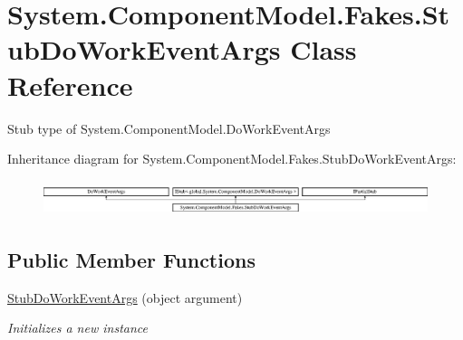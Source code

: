 \hypertarget{class_system_1_1_component_model_1_1_fakes_1_1_stub_do_work_event_args}{\section{System.\-Component\-Model.\-Fakes.\-Stub\-Do\-Work\-Event\-Args Class Reference}
\label{class_system_1_1_component_model_1_1_fakes_1_1_stub_do_work_event_args}
}


Stub type of System.\-Component\-Model.\-Do\-Work\-Event\-Args 


Inheritance diagram for System.\-Component\-Model.\-Fakes.\-Stub\-Do\-Work\-Event\-Args\-:\begin{figure}[H]
\begin{center}
\leavevmode
\includegraphics[height=1.037037cm]{class_system_1_1_component_model_1_1_fakes_1_1_stub_do_work_event_args}
\end{center}
\end{figure}
\subsection*{Public Member Functions}
\begin{DoxyCompactItemize}
\item 
\hyperlink{class_system_1_1_component_model_1_1_fakes_1_1_stub_do_work_event_args_aca44c894f1d6f640f1409d403d6a90dc}{Stub\-Do\-Work\-Event\-Args} (object argument)
\begin{DoxyCompactList}\small\item\em Initializes a new instance\end{DoxyCompactList}\end{DoxyCompactItemize}
